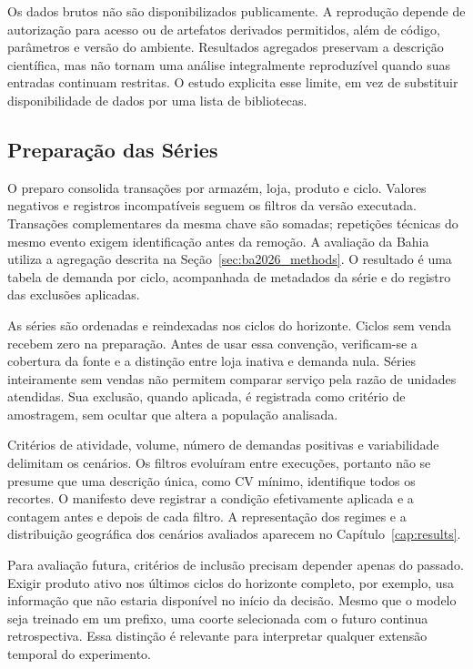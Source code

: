 Os dados brutos não são disponibilizados publicamente. A reprodução depende de autorização para acesso ou de artefatos derivados permitidos, além de código, parâmetros e versão do ambiente. Resultados agregados preservam a descrição científica, mas não tornam uma análise integralmente reproduzível quando suas entradas continuam restritas. O estudo explicita esse limite, em vez de substituir disponibilidade de dados por uma lista de bibliotecas.

\subsection{Preparação das Séries}
\label{sec:pipeline_experimental}

O preparo consolida transações por armazém, loja, produto e ciclo. Valores negativos e registros incompatíveis seguem os filtros da versão executada. Transações complementares da mesma chave são somadas; repetições técnicas do mesmo evento exigem identificação antes da remoção. A avaliação da Bahia utiliza a agregação descrita na Seção~\ref{sec:ba2026_methods}. O resultado é uma tabela de demanda por ciclo, acompanhada de metadados da série e do registro das exclusões aplicadas.

As séries são ordenadas e reindexadas nos ciclos do horizonte. Ciclos sem venda recebem zero na preparação. Antes de usar essa convenção, verificam-se a cobertura da fonte e a distinção entre loja inativa e demanda nula. Séries inteiramente sem vendas não permitem comparar serviço pela razão de unidades atendidas. Sua exclusão, quando aplicada, é registrada como critério de amostragem, sem ocultar que altera a população analisada.

Critérios de atividade, volume, número de demandas positivas e variabilidade delimitam os cenários. Os filtros evoluíram entre execuções, portanto não se presume que uma descrição única, como CV mínimo, identifique todos os recortes. O manifesto deve registrar a condição efetivamente aplicada e a contagem antes e depois de cada filtro. A representação dos regimes e a distribuição geográfica dos cenários avaliados aparecem no Capítulo~\ref{cap:results}.

Para avaliação futura, critérios de inclusão precisam depender apenas do passado. Exigir produto ativo nos últimos ciclos do horizonte completo, por exemplo, usa informação que não estaria disponível no início da decisão. Mesmo que o modelo seja treinado em um prefixo, uma coorte selecionada com o futuro continua retrospectiva. Essa distinção é relevante para interpretar qualquer extensão temporal do experimento.

